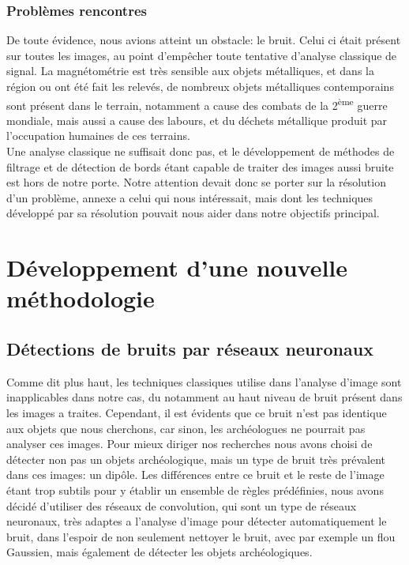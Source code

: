 \documentclass[a4paper, 12pt, titlepage, oneside, french]{article}
\begin{document}
	\subsubsection{Problèmes rencontres}
	De toute évidence, nous avions atteint un obstacle: le bruit. Celui ci était présent sur toutes les images, au point d'empêcher toute tentative d'analyse classique de signal. La magnétométrie est très sensible aux objets métalliques, et dans la région ou ont été fait les relevés, de nombreux objets métalliques contemporains sont présent dans le terrain, notamment a cause des combats de la 2\textsuperscript{ème} guerre mondiale, mais aussi a cause des labours, et du déchets métallique produit par l'occupation humaines de ces terrains.\\
	Une analyse classique ne suffisait donc pas, et le développement de méthodes de filtrage et de détection de bords étant capable de traiter des images aussi bruite est hors de notre porte. Notre attention devait donc se porter sur la résolution d'un problème, annexe a celui qui nous intéressait, mais dont les techniques développé par sa résolution pouvait nous aider dans notre objectifs principal.

\newpage
\section{Développement d'une nouvelle méthodologie}
	\subsection{Détections de bruits par réseaux neuronaux}
	Comme dit plus haut, les techniques classiques utilise dans l'analyse d'image sont inapplicables dans notre cas, du notamment au haut niveau de bruit présent dans les images a traites. Cependant, il est évidents que ce bruit n'est pas identique aux objets que nous cherchons, car sinon, les archéologues ne pourrait pas analyser ces images. Pour mieux diriger nos recherches nous avons choisi de détecter non pas un objets archéologique, mais un type de bruit très prévalent dans ces images: un dipôle. Les différences entre ce bruit et le reste de l'image étant trop subtils pour y établir un ensemble de règles prédéfinies, nous avons décidé d'utiliser des réseaux de convolution, qui sont un type de réseaux neuronaux, très adaptes a l'analyse d'image pour détecter automatiquement le bruit, dans l'espoir de non seulement nettoyer le bruit, avec par exemple un flou Gaussien, mais également de détecter les objets archéologiques.
\end{document}
